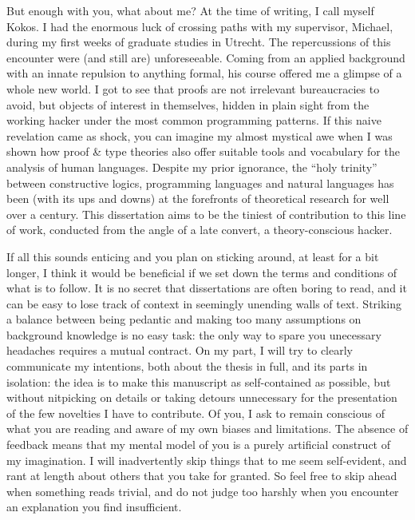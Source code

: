 {{	But enough with you, what about me? 
	At the time of writing, I call myself Kokos. 
	I had the enormous luck of crossing paths with my supervisor, Michael, during my first weeks of graduate studies in Utrecht. 
	The repercussions of this encounter were (and still are) unforeseeable. 
	Coming from an applied background with an innate repulsion to anything formal, his course offered me a glimpse of a whole new world. 
	I got to see that proofs are not irrelevant bureaucracies to avoid, but objects of interest in themselves, hidden in plain sight from the working hacker under the most common programming patterns. 
	If this naive revelation came as shock, you can imagine my almost mystical awe when I was shown how proof \& type theories also offer suitable tools and vocabulary for the analysis of human languages. 
	Despite my prior ignorance, the “holy trinity” between constructive logics, programming languages and natural languages has been (with its ups and downs) at the forefronts of theoretical research for well over a century. 
	This dissertation aims to be the tiniest of contribution to this line of work, conducted from the angle of a late convert, a theory-conscious hacker. 
	
	If all this sounds enticing and you plan on sticking around, at least for a bit longer, I think it would be beneficial if we set down the terms and conditions of what is to follow. 
	It is no secret that dissertations are often boring to read, and it can be easy to lose track of context in seemingly unending walls of text. 
	Striking a balance between being pedantic and making too many assumptions on background knowledge is no easy task: the only way to spare you unecessary headaches requires a mutual contract. 
	On my part, I will try to clearly communicate my intentions, both about the thesis in full, and its parts in isolation: the idea is to make this manuscript as self-contained as possible, but without nitpicking on details or taking detours unnecessary for the presentation of the few novelties I have to contribute.
	Of you, I ask to remain conscious of what you are reading and aware of my own biases and limitations. 
	The absence of feedback means that my mental model of you is a purely artificial construct of my imagination.
	I will inadvertently skip things that to me seem self-evident, and rant at length about others that you take for granted.
	So feel free to skip ahead when something reads trivial, and do not judge too harshly when you encounter an explanation you find insufficient.
	
}}

